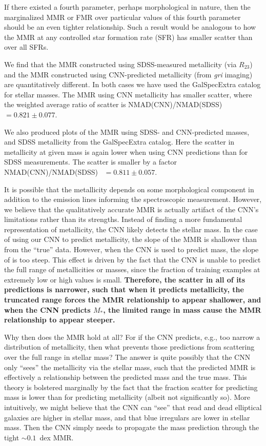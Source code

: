 \documentclass[fleqn,usenatbib]{mnras}
\begin{document}
If there existed a fourth parameter, perhaps morphological in nature, then the marginalized MMR or FMR over particular values of this fourth parameter should be an even tighter relationship.
Such a result would be analogous to how the MMR at any controlled star formation rate (SFR) has smaller scatter than over all SFRs.

We find that the MMR constructed using SDSS-measured metallicity (via $R_{23}$) and the MMR constructed using CNN-predicted metallicity (from \textit{gri} imaging) are quantitatively different.
In both cases we have used the GalSpecExtra catalog for stellar masses.
The MMR using CNN metallicity has smaller scatter, where the weighted average ratio of scatter is NMAD(CNN)/NMAD(SDSS)~$= 0.821 \pm 0.077$.


We also produced plots of the MMR using SDSS- and CNN-predicted masses, and SDSS metallicity from the GalSpecExtra catalog.
Here the scatter in metallicity at given mass is again lower when using CNN predictions than for SDSS measurements.
The scatter is smaller by a factor NMAD(CNN)/NMAD(SDSS)~ $= 0.811 \pm 0.057$.

It is possible that the metallicity depends on some morphological component in addition to the emission lines informing the spectroscopic measurement.
However, we believe that the qualitatively accurate MMR is actually artifact of the CNN's limitations rather than its strengths.
Instead of finding a more fundamental representation of metallicity, the CNN likely detects the stellar mass.
In the case of using our CNN to predict metallicity, the slope of the MMR is shallower than from the ``true'' data. 
However, when the CNN is used to predict mass, the slope of is too steep.
This effect is driven by the fact that the CNN is unable to predict the full range of metallicities or masses, since the fraction of training examples at extremely low or high values is small.
\textbf{Therefore, the scatter in all of its predictions is narrower, such that when it predicts metallicity, the truncated range forces the MMR relationship to appear shallower, and when the CNN predicts $M_*$, the limited range in mass cause the MMR relationship to appear steeper.}

Why then does the MMR hold at all?
For if the CNN predicts, e.g., too narrow a distribution of metallicity, then what prevents those predictions from scattering over the full range in stellar mass?
The answer is quite possibly that the CNN only ``sees'' the metallicity via the stellar mass, such that the predicted MMR is effectively a relationship between the predicted mass and the true mass.
This theory is bolstered marginally by the fact that the fraction scatter for predicting mass is lower than for predicting metallicity (albeit not significantly so).
More intuitively, we might believe that the CNN can ``see'' that read and dead elliptical galaxies are higher in stellar mass, and that blue irregulars are lower in stellar mass.
Then the CNN simply needs to propagate the mass prediction through the tight $\sim 0.1$~dex MMR.
\end{document}
